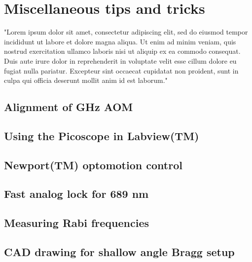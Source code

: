 \chapter{Miscellaneous tips and tricks}
"Lorem ipsum dolor sit amet, consectetur adipiscing elit, sed do eiusmod tempor incididunt ut labore et dolore magna aliqua. Ut enim ad minim veniam, quis nostrud exercitation ullamco laboris nisi ut aliquip ex ea commodo consequat. Duis aute irure dolor in reprehenderit in voluptate velit esse cillum dolore eu fugiat nulla pariatur. Excepteur sint occaecat cupidatat non proident, sunt in culpa qui officia deserunt mollit anim id est laborum."

\section{Alignment of GHz AOM}
\section{Using the Picoscope in Labview(TM)}
\section{Newport(TM) optomotion control}
\section{Fast analog lock for 689 nm}
\section{Measuring Rabi frequencies}
\section{CAD drawing for shallow angle Bragg setup}
